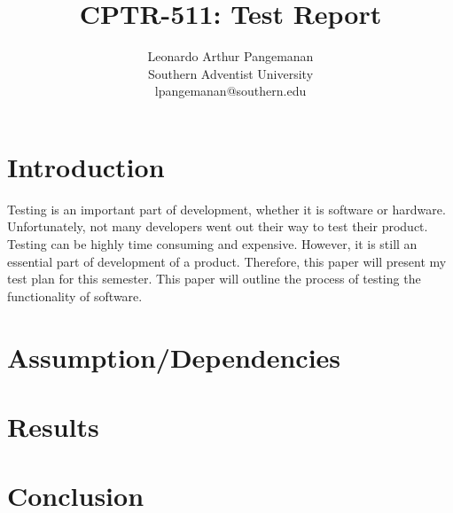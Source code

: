 \documentclass[pdf,bookmarks,colorlinks=true]{article}
\title{CPTR-511: Test Report}
\author{Leonardo Arthur Pangemanan\\
	Southern Adventist University\\
	lpangemanan@southern.edu
}
\begin{document}
	\maketitle
	
	\section{Introduction}
		Testing is an important part of development, whether it is software or hardware. Unfortunately, not many developers went out their way to test their product. Testing can be highly time consuming and expensive. However, it is still an essential part of development of a product. Therefore, this paper will present my test plan for this semester. This paper will outline the process of testing the functionality of software.
	\section{Assumption/Dependencies}
	\section{Results}
	\section{Conclusion}
	
\end{document}
